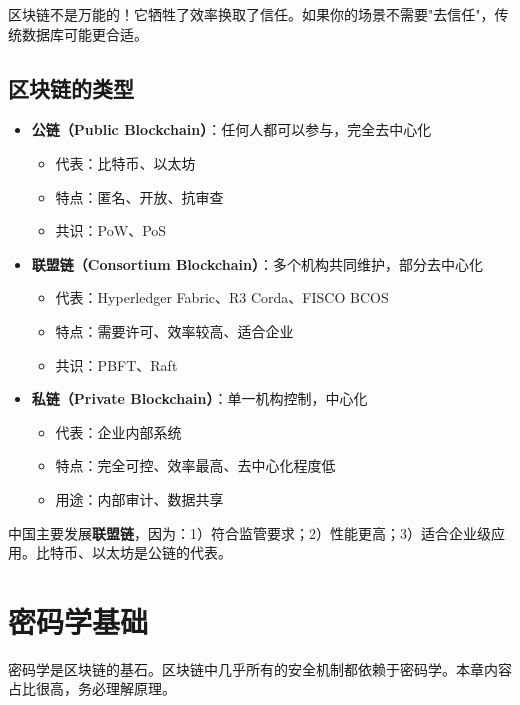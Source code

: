 ﻿\documentclass[12pt,a4paper]{article}
\begin{document}
\begin{keypointbox}
区块链不是万能的！它牺牲了效率换取了信任。如果你的场景不需要"去信任"，传统数据库可能更合适。
\end{keypointbox}

\subsection{区块链的类型}

\begin{itemize}[leftmargin=1.5em]
\item \textbf{公链（Public Blockchain）}：任何人都可以参与，完全去中心化
  \begin{itemize}
  \item 代表：比特币、以太坊
  \item 特点：匿名、开放、抗审查
  \item 共识：PoW、PoS
  \end{itemize}
\item \textbf{联盟链（Consortium Blockchain）}：多个机构共同维护，部分去中心化
  \begin{itemize}
  \item 代表：Hyperledger Fabric、R3 Corda、FISCO BCOS
  \item 特点：需要许可、效率较高、适合企业
  \item 共识：PBFT、Raft
  \end{itemize}
\item \textbf{私链（Private Blockchain）}：单一机构控制，中心化
  \begin{itemize}
  \item 代表：企业内部系统
  \item 特点：完全可控、效率最高、去中心化程度低
  \item 用途：内部审计、数据共享
  \end{itemize}
\end{itemize}

\begin{exambox}
中国主要发展\textbf{联盟链}，因为：1）符合监管要求；2）性能更高；3）适合企业级应用。比特币、以太坊是公链的代表。
\end{exambox}

\section{密码学基础}

密码学是区块链的基石。区块链中几乎所有的安全机制都依赖于密码学。本章内容占比很高，务必理解原理。
\end{document}

